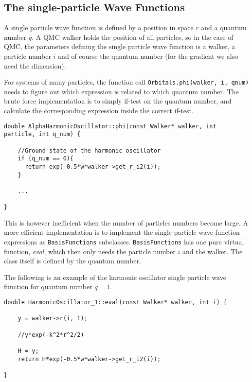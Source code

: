 \subsection{The single-particle Wave Functions}
\label{sec:optSPWFqnumIndie}

A single particle wave function is defined by a position in space $r$ and a quantum number $q$. A QMC walker holds the position of all particles, so in the case of QMC, the parameters defining the single particle wave function is a walker, a particle number $i$ and of course the quantum number (for the gradient we also need the dimension).

For systems of many particles, the function call \verb+Orbitals.phi(walker, i, qnum)+ needs to figure out which expression is related to which quantum number. The brute force implementation is to simply if-test on the quantum number, and calculate the corresponding expression inside the correct if-test.

\begin{lstlisting}
double AlphaHarmonicOscillator::phi(const Walker* walker, int particle, int q_num) {
    
    //Ground state of the harmonic oscillator
    if (q_num == 0){
      return exp(-0.5*w*walker->get_r_i2(i));
    }
    
    ...
    
}
\end{lstlisting}

This is however inefficient when the number of particles numbers become large. A more efficient implementation is to implement the single particle wave function expressions as \verb+BasisFunctions+ subclasses. \verb+BasisFunctions+ has one pure virtual function, \textit{eval}, which then only needs the particle number $i$ and the walker. The class itself is defined by the quantum number. 

The following is an example of the harmonic oscillator single particle wave function for quantum number $q=1$.

\begin{lstlisting}
double HarmonicOscillator_1::eval(const Walker* walker, int i) {

    y = walker->r(i, 1);
    
    //y*exp(-k^2*r^2/2)
    
    H = y;
    return H*exp(-0.5*w*walker->get_r_i2(i));
    
}
\end{lstlisting}

